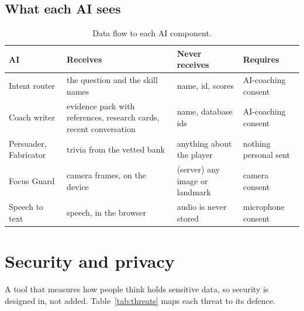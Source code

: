\documentclass[11pt,a4paper]{article}
\begin{document}
\subsection{What each AI sees}

\begin{table}[H]
\centering\small
\caption{Data flow to each AI component.}
\label{tab:dataflow}
\begin{tabularx}{\linewidth}{@{}>{\raggedright}p{2.6cm} >{\raggedright}X >{\raggedright}p{2.8cm} >{\raggedright\arraybackslash}p{2.6cm}@{}}
\toprule
AI & Receives & Never receives & Requires\\
\midrule
Intent router & the question and the skill names & name, id, scores & AI-coaching consent\\
Coach writer & evidence pack with references, research cards, recent conversation & name, database ids & AI-coaching consent\\
Persuader, Fabricator & trivia from the vetted bank & anything about the player & nothing personal sent\\
Focus Guard & camera frames, on the device & (server) any image or landmark & camera consent\\
Speech to text & speech, in the browser & audio is never stored & microphone consent\\
\bottomrule
\end{tabularx}
\end{table}

\section{Security and privacy}
\label{sec:security}

A tool that measures how people think holds sensitive data, so security is designed in, not added. Table~\ref{tab:threats} maps each threat to its defence.
\end{document}
